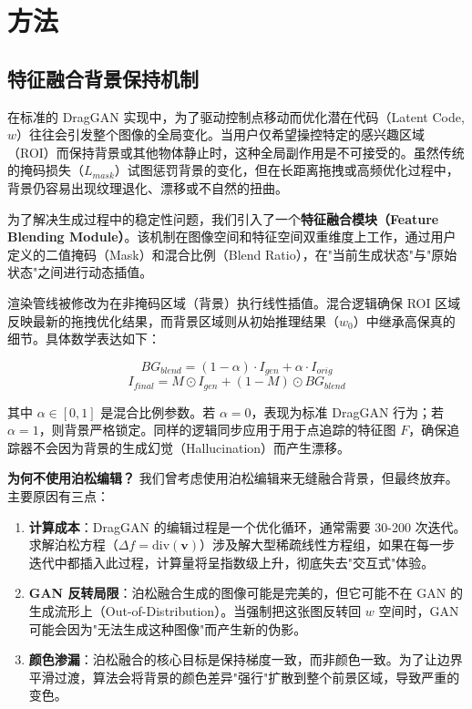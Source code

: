\documentclass[a4paper,10pt]{ctexart}
\begin{document}
\section{方法}

\subsection{特征融合背景保持机制}
在标准的 DragGAN 实现中，为了驱动控制点移动而优化潜在代码（Latent Code, $w$）往往会引发整个图像的全局变化。当用户仅希望操控特定的感兴趣区域（ROI）而保持背景或其他物体静止时，这种全局副作用是不可接受的。虽然传统的掩码损失（$L_{mask}$）试图惩罚背景的变化，但在长距离拖拽或高频优化过程中，背景仍容易出现纹理退化、漂移或不自然的扭曲。

为了解决生成过程中的稳定性问题，我们引入了一个\textbf{特征融合模块（Feature Blending Module）}。该机制在图像空间和特征空间双重维度上工作，通过用户定义的二值掩码（Mask）和混合比例（Blend Ratio），在"当前生成状态"与"原始状态"之间进行动态插值。

渲染管线被修改为在非掩码区域（背景）执行线性插值。混合逻辑确保 ROI 区域反映最新的拖拽优化结果，而背景区域则从初始推理结果（$w_0$）中继承高保真的细节。具体数学表达如下：

\begin{equation}
BG_{blend} = (1 - \alpha) \cdot I_{gen} + \alpha \cdot I_{orig}
\end{equation}
\begin{equation}
I_{final} = M \odot I_{gen} + (1 - M) \odot BG_{blend}
\end{equation}

其中 $\alpha \in [0, 1]$ 是混合比例参数。若 $\alpha = 0$，表现为标准 DragGAN 行为；若 $\alpha = 1$，则背景严格锁定。同样的逻辑同步应用于用于点追踪的特征图 $F$，确保追踪器不会因为背景的生成幻觉（Hallucination）而产生漂移。

\textbf{为何不使用泊松编辑？} 我们曾考虑使用泊松编辑来无缝融合背景，但最终放弃。主要原因有三点：
\begin{enumerate}
    \item \textbf{计算成本}：DragGAN 的编辑过程是一个优化循环，通常需要 30-200 次迭代。求解泊松方程（$\Delta f = \text{div}(\mathbf{v})$）涉及解大型稀疏线性方程组，如果在每一步迭代中都插入此过程，计算量将呈指数级上升，彻底失去"交互式"体验。
    \item \textbf{GAN 反转局限}：泊松融合生成的图像可能是完美的，但它可能不在 GAN 的生成流形上（Out-of-Distribution）。当强制把这张图反转回 $w$ 空间时，GAN 可能会因为"无法生成这种图像"而产生新的伪影。
    \item \textbf{颜色渗漏}：泊松融合的核心目标是保持梯度一致，而非颜色一致。为了让边界平滑过渡，算法会将背景的颜色差异"强行"扩散到整个前景区域，导致严重的变色。
\end{enumerate}
\end{document}
